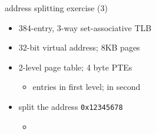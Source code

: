
\begin{frame}{address splitting exercise (3)}
\begin{itemize}
\item 384-entry, 3-way set-associative TLB
\item 32-bit virtual address; 8KB pages
\item 2-level page table; 4 byte PTEs
    \begin{itemize}
    \item {} entries in first level;  in second
    \end{itemize}
\item split the address {\tt 0x12345678}
    \begin{itemize}
    \item<2-> {\tt {}}
    \iftoggle{heldback}{}{
    \item<3-> 13-bit page offset \myemph<3>{\tt 1 0110 0111 1000}
    \item<4-> $32-13=19$-bit VPN \myemph<4>{\tt 0001 0010 0011 0100 010}
    \item<5-> 8-bit first part of VPN \myemph<5>{\tt 0001 0010}
    \item<6-> 11-bit second part of VPN \myemph<6>{\tt 0011 0100 010}
    \item<7-> 7-bit TLB index \myemph<7>{0100 010}
    \item<8-> $19-7=12$-bit TLB tag \myemph<8>{0001 0010 0011}
    }
    \end{itemize}
\end{itemize}
\end{frame}
